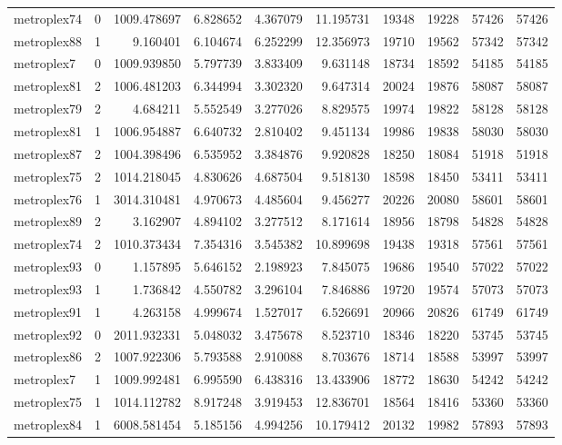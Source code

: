 \begin{longtable}{|l|r|r|r|r|r|r|r|r|r|}
metroplex74 & 0 & 1009.478697 & 6.828652 & 4.367079 & 11.195731 & 19348 & 19228 & 57426 & 57426 \\
metroplex88 & 1 & 9.160401 & 6.104674 & 6.252299 & 12.356973 & 19710 & 19562 & 57342 & 57342 \\
metroplex7 & 0 & 1009.939850 & 5.797739 & 3.833409 & 9.631148 & 18734 & 18592 & 54185 & 54185 \\
metroplex81 & 2 & 1006.481203 & 6.344994 & 3.302320 & 9.647314 & 20024 & 19876 & 58087 & 58087 \\
metroplex79 & 2 & 4.684211 & 5.552549 & 3.277026 & 8.829575 & 19974 & 19822 & 58128 & 58128 \\
metroplex81 & 1 & 1006.954887 & 6.640732 & 2.810402 & 9.451134 & 19986 & 19838 & 58030 & 58030 \\
metroplex87 & 2 & 1004.398496 & 6.535952 & 3.384876 & 9.920828 & 18250 & 18084 & 51918 & 51918 \\
metroplex75 & 2 & 1014.218045 & 4.830626 & 4.687504 & 9.518130 & 18598 & 18450 & 53411 & 53411 \\
metroplex76 & 1 & 3014.310481 & 4.970673 & 4.485604 & 9.456277 & 20226 & 20080 & 58601 & 58601 \\
metroplex89 & 2 & 3.162907 & 4.894102 & 3.277512 & 8.171614 & 18956 & 18798 & 54828 & 54828 \\
metroplex74 & 2 & 1010.373434 & 7.354316 & 3.545382 & 10.899698 & 19438 & 19318 & 57561 & 57561 \\
metroplex93 & 0 & 1.157895 & 5.646152 & 2.198923 & 7.845075 & 19686 & 19540 & 57022 & 57022 \\
metroplex93 & 1 & 1.736842 & 4.550782 & 3.296104 & 7.846886 & 19720 & 19574 & 57073 & 57073 \\
metroplex91 & 1 & 4.263158 & 4.999674 & 1.527017 & 6.526691 & 20966 & 20826 & 61749 & 61749 \\
metroplex92 & 0 & 2011.932331 & 5.048032 & 3.475678 & 8.523710 & 18346 & 18220 & 53745 & 53745 \\
metroplex86 & 2 & 1007.922306 & 5.793588 & 2.910088 & 8.703676 & 18714 & 18588 & 53997 & 53997 \\
metroplex7 & 1 & 1009.992481 & 6.995590 & 6.438316 & 13.433906 & 18772 & 18630 & 54242 & 54242 \\
metroplex75 & 1 & 1014.112782 & 8.917248 & 3.919453 & 12.836701 & 18564 & 18416 & 53360 & 53360 \\
metroplex84 & 1 & 6008.581454 & 5.185156 & 4.994256 & 10.179412 & 20132 & 19982 & 57893 & 57893 \\

\end{longtable}
